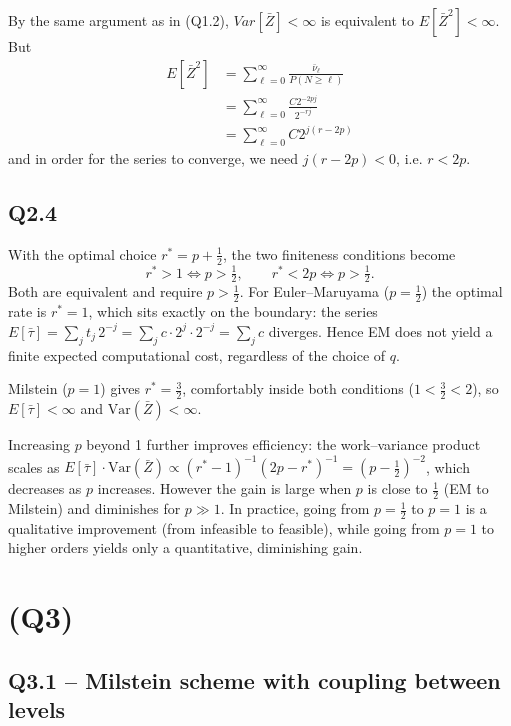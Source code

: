 \documentclass[11pt, a4paper]{article}
\begin{document}
By the same argument as in (Q1.2), $Var[\bar{Z}]<\infty$ is equivalent to $E\left[\bar{Z}^2\right]<\infty$.
But 
\begin{align*}
    E[\bar{Z}^2]
    &= \sum_{\ell=0}^{\infty}\frac{\bar{\nu}_\ell}{P(N\ge \ell)}\\
    &= \sum_{\ell=0}^{\infty}\frac{C2^{-2pj}}{2^{-rj}}\\
    &= \sum_{\ell=0}^{\infty}C 2^{j(r-2p)}
\end{align*}
and in order for the series to converge, we need $j(r-2p)<0$, i.e. $r<2p$.

\subsection*{Q2.4} With the optimal choice $r^*=p+\frac12$, the two finiteness conditions become
\[
  r^* > 1 \iff p > \tfrac12, \qquad r^* < 2p \iff p > \tfrac12.
\]
Both are equivalent and require $p>\frac12$. For Euler--Maruyama ($p=\frac12$) the optimal rate
is $r^*=1$, which sits exactly on the boundary: the series $E[\bar\tau]=\sum_j
t_j\,2^{-j}=\sum_j c\cdot 2^j\cdot 2^{-j}=\sum_j c$ diverges. Hence EM does not yield
a finite expected computational cost, regardless of the choice of $q$.

Milstein ($p=1$) gives $r^*=\frac32$, comfortably inside both conditions ($1<\frac32<2$),
so $E[\bar\tau]<\infty$ and $\text{Var}(\bar Z)<\infty$.

Increasing $p$ beyond 1 further improves efficiency: the work--variance product scales as
$E[\bar\tau]\cdot\text{Var}(\bar Z)\propto(r^*-1)^{-1}(2p-r^*)^{-1}=(p-\tfrac12)^{-2}$,
which decreases as $p$ increases. However the gain is large when $p$ is close to $\frac12$
(EM to Milstein) and diminishes for $p\gg 1$. In practice, going from $p=\frac12$ to $p=1$
is a qualitative improvement (from infeasible to feasible), while going from $p=1$ to higher
orders yields only a quantitative, diminishing gain.

\section*{(Q3)}

\subsection*{Q3.1 -- Milstein scheme with coupling between levels}
\end{document}

